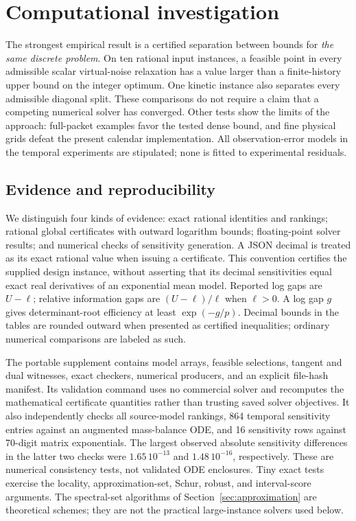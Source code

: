 \section{Computational investigation}\label{sec:computation}

The strongest empirical result is a certified separation between bounds for
\emph{the same discrete problem}. On ten rational input instances, a feasible
point in every admissible scalar virtual-noise relaxation has a value larger
than a finite-history upper bound on the integer optimum. One kinetic instance
also separates every admissible diagonal split. These comparisons do not
require a claim that a competing numerical solver has converged. Other tests
show the limits of the approach: full-packet examples favor the tested dense
bound, and fine physical grids defeat the present calendar implementation.
All observation-error models in the temporal experiments are stipulated;
none is fitted to experimental residuals.

\subsection{Evidence and reproducibility}\label{subsec:computational-evidence}

We distinguish four kinds of evidence: exact rational identities and rankings;
rational global certificates with outward logarithm bounds; floating-point
solver results; and numerical checks of sensitivity generation. A JSON decimal
is treated as its exact rational value when issuing a certificate. This convention
certifies the supplied design instance, without asserting that its decimal
sensitivities equal exact real derivatives of an exponential mean model.
Reported log gaps are $U-\ell$; relative information gaps are
$(U-\ell)/\ell$ when $\ell>0$. A log gap $g$ gives determinant-root efficiency
at least $\exp(-g/p)$. Decimal bounds in the tables are rounded outward when
presented as certified inequalities; ordinary numerical comparisons are labeled
as such.

The portable supplement contains model arrays, feasible selections, tangent
and dual witnesses, exact checkers, numerical producers, and an explicit
file-hash manifest. Its validation command uses no commercial solver and
recomputes the mathematical certificate quantities rather than trusting saved
solver objectives. It also independently checks all source-model rankings,
864 temporal sensitivity entries against an augmented mass-balance ODE, and
16 sensitivity rows against 70-digit matrix exponentials. The largest observed
absolute sensitivity differences in the latter two checks were
$1.65\,10^{-13}$ and $1.48\,10^{-16}$, respectively. These are numerical
consistency tests, not validated ODE enclosures. Tiny exact tests exercise the
locality, approximation-set, Schur, robust, and interval-score arguments.
The spectral-set algorithms of Section~\ref{sec:approximation} are theoretical
schemes; they are not the practical large-instance solvers used below.

